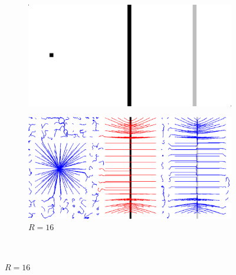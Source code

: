 \begin{figure}[!h]
   \begin{subfigure}[c]{.5\linewidth}
     \centering
     \includegraphics[width=\textwidth]{Chapters/Images/synthetic_map.png}
     \caption{}
   \end{subfigure} 
      \begin{subfigure}[c]{.5\linewidth}
     \centering
     \includegraphics[width=\textwidth]{Chapters/Images/m1_radius_16.png}
     \caption{$R=16$}
   \end{subfigure} \\
   

\end{figure}
